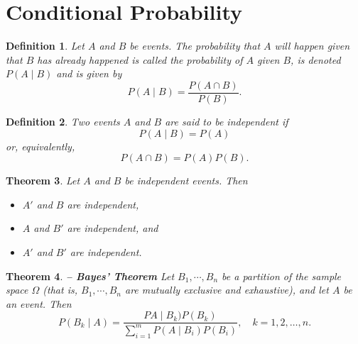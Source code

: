 \documentclass[1pt]{report}
\newtheorem{thm}{Theorem}[chapter]
\newtheorem{defn}[thm]{Definition}
\newcommand{\<}{\langle}
\renewcommand{\>}{\rangle}
\begin{document}
\section{Conditional Probability}
\begin{defn}\label{def:conditional}
Let $A$ and $B$ be events. The probability that $A$ will happen given that $B$ has already happened is called the \emph{probability of $A$ given $B$}, is denoted $P(A\mid B)$ and is given by
$$P(A \mid B) = \frac{P(A\cap B)}{P(B)}.$$
\end{defn}
\begin{defn}\label{def:independent}
Two events $A$ and $B$ are said to be independent if 
$$P(A\mid B) = P(A)$$
or, equivalently,
$$P(A \cap B) = P(A)P(B).$$
\end{defn}
\begin{thm}\label{thm:independentcomplement}
Let $A$ and $B$ be independent events. Then
\begin{itemize}
\item $A'$ and $B$ are independent,
\item $A$ and $B'$ are independent, and
\item $A'$ and $B'$ are independent.
\end{itemize}
\end{thm}
\begin{thm}\label{bayes}\textbf{ -- Bayes' Theorem} 
Let $B_1, \cdots, B_n$ be a partition of the sample space $\Omega$ (that is, $B_1,\cdots, B_n$ are mutually exclusive and exhaustive), and let $A$ be an event. Then
$$P( B_k \mid A ) = \frac{PA \mid B_k) P(B_k)}{\sum\limits_{i=1}^m P(A\mid B_i) P (B_i)}, \quad k = 1,2,\dots, n.$$
\end{thm}
\end{document}

